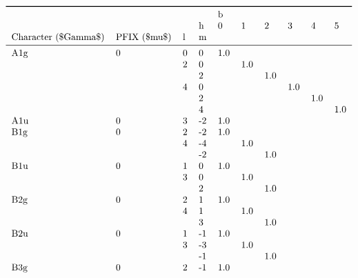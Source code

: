 \documentclass[letterpaper,table,10pt,english]{jupyterBook}
\begin{document}
\begin{figure}[htbp]
\centering
\capstart
\begin{equation*}
\begin{split}\begin{tabular}{llllllllll}
\toprule
    &   &   & {} & \multicolumn{6}{l}{b} \\
    &   &   & h &    0 &    1 &    2 &    3 &    4 &    5 \\
Character (\$\textbackslash Gamma\$) & PFIX (\$\textbackslash mu\$) & l & m &      &      &      &      &      &      \\
\midrule
A1g & 0 & 0 &  0 &  1.0 &      &      &      &      &      \\
    &   & 2 &  0 &      &  1.0 &      &      &      &      \\
    &   &   &  2 &      &      &  1.0 &      &      &      \\
    &   & 4 &  0 &      &      &      &  1.0 &      &      \\
    &   &   &  2 &      &      &      &      &  1.0 &      \\
    &   &   &  4 &      &      &      &      &      &  1.0 \\
A1u & 0 & 3 & -2 &  1.0 &      &      &      &      &      \\
B1g & 0 & 2 & -2 &  1.0 &      &      &      &      &      \\
    &   & 4 & -4 &      &  1.0 &      &      &      &      \\
    &   &   & -2 &      &      &  1.0 &      &      &      \\
B1u & 0 & 1 &  0 &  1.0 &      &      &      &      &      \\
    &   & 3 &  0 &      &  1.0 &      &      &      &      \\
    &   &   &  2 &      &      &  1.0 &      &      &      \\
B2g & 0 & 2 &  1 &  1.0 &      &      &      &      &      \\
    &   & 4 &  1 &      &  1.0 &      &      &      &      \\
    &   &   &  3 &      &      &  1.0 &      &      &      \\
B2u & 0 & 1 & -1 &  1.0 &      &      &      &      &      \\
    &   & 3 & -3 &      &  1.0 &      &      &      &      \\
    &   &   & -1 &      &      &  1.0 &      &      &      \\
B3g & 0 & 2 & -1 &  1.0 &      &      &      &      &      \\

\end{tabular}
\end{split}
\end{equation*}
\end{figure}
\end{document}
